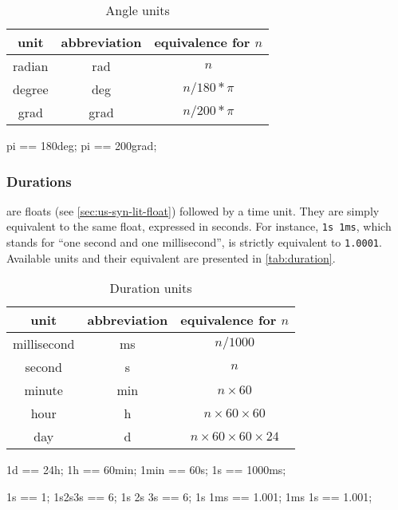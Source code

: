 \begin{table}[\floatposh]
  \centering
  \begin{tabular}{|c|c|c|}
    \hline
    unit        & abbreviation & equivalence for $n$  \\
    \hline
    radian      & rad          & $n$         \\
    degree      & deg          & $n / 180 * \pi$        \\
    grad        & grad         & $n / 200 * \pi$        \\
    \hline
  \end{tabular}
  \caption{Angle units}
  \label{tab:angle}
\end{table}

\begin{urbiassert}[firstnumber=last]
pi == 180deg;
pi == 200grad;
\end{urbiassert}

\subsubsection{Durations}

 are floats (see \autoref{sec:us-syn-lit-float})
followed by a time unit. They are simply equivalent to the same float,
expressed in seconds. For instance, \lstinline|1s 1ms|, which stands
for ``one second and one millisecond'', is strictly equivalent to
\lstinline|1.0001|. Available units and their equivalent are presented
in \autoref{tab:duration}.

\begin{table}
  \centering
  \begin{tabular}{|c|c|c|}
    \hline
    unit        & abbreviation & equivalence for $n$  \\
    \hline
    millisecond & ms           & $n / 1000$         \\
    second      & s            & $n$                \\
    minute      & min          & $n \times 60$           \\
    hour        & h            & $n \times 60 \times 60$      \\
    day         & d            & $n \times 60 \times 60 \times 24$ \\
    \hline
  \end{tabular}
  \caption{Duration units}
  \label{tab:duration}
\end{table}

\begin{urbiassert}[firstnumber=last]
1d == 24h;
1h == 60min;
1min == 60s;
1s == 1000ms;

1s == 1;
1s2s3s == 6;
1s 2s 3s == 6;
1s 1ms == 1.001;
1ms 1s == 1.001;
\end{urbiassert}

